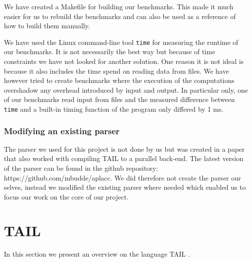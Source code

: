 \documentclass[11pt]{article}
\begin{document}
We have created a Makefile for building our benchmarks. This made it much easier for us to rebuild the benchmarks and can also be used
as a reference of how to build them manually.

We have used the Linux command-line tool {\tt time} for measuring the runtime of our benchmarks. 
It is not necessarily the best way but because of time constraints we have not looked for another solution.
One reason it is not ideal is because it also includes the time spend on reading data from files.
We have however tried to create benchmarks where the execution of the computations overshadow any overhead introduced by input and output.
In particular only, one of our benchmarks read
input from files and the measured difference between {\tt time} and a built-in timing function of the program only differed by 1 ms. 

\subsubsection{Modifying an existing parser}
The parser we used for this project is not done by us but was created in a paper that also worked with compiling TAIL to a parallel back-end\cite{APLACC}. 
The latest version of the parser can be found in the github repository: https://github.com/mbudde/aplacc.
We did therefore not create the parser our selves,
instead we modified the existing parser where needed which enabled us to focus our work on the core of our project.

\section{TAIL}
\label{sec:tail}
In this section we present an overview on the language TAIL \cite{ElsmanDybdal:Array:2014}. 
\end{document}

